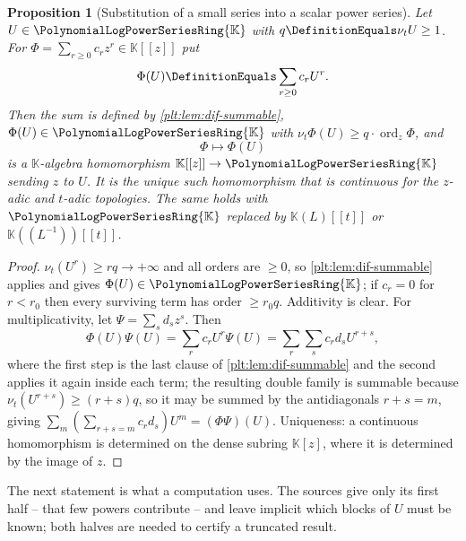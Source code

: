 \documentclass[11pt,oneside]{article}
\theoremstyle{plain}
\newtheorem{proposition}[theorem]{Proposition}
\theoremstyle{definition}
\theoremstyle{remark}
\newcommand{\K}{\mathbb{K}}
\newcommand{\PLpow}{\PolynomialLogPowerSeriesRing{\K}}   %
\newcommand{\ordt}{\nu_{t}}                              %
\begin{document}
\begin{proposition}[Substitution of a small series into a scalar power series]
\label{plt:prop:dif-substitution}
Let \(U\in\PLpow\) with \(q\DefinitionEquals\ordt U\ge1\).  For
\(\Phi=\sum_{r\ge0}c_{r}z^{r}\in\K[[z]]\) put
\begin{equation}\label{plt:eq:dif-substitution}
  \Phi(U)\DefinitionEquals\sum_{r\ge0}c_{r}U^{r}.
\end{equation}
Then the sum is defined by \cref{plt:lem:dif-summable}, \(\Phi(U)\in\PLpow\)
with \(\ordt\Phi(U)\ge q\cdot\operatorname{ord}_{z}\Phi\), and
\[
  \Phi\longmapsto\Phi(U)
\]
is a \(\K\)-algebra homomorphism \(\K[[z]]\to\PLpow\) sending \(z\) to \(U\).
It is the unique such homomorphism that is continuous for the \(z\)-adic and
\(t\)-adic topologies.  The same holds with \(\PLpow\) replaced by
\(\K(L)[[t]]\) or \(\K((L^{-1}))[[t]]\).
\end{proposition}

\begin{proof}
\(\ordt(U^{r})\ge rq\to+\infty\) and all orders are \(\ge0\), so
\cref{plt:lem:dif-summable} applies and gives \(\Phi(U)\in\PLpow\); if
\(c_{r}=0\) for \(r<r_{0}\) then every surviving term has order \(\ge r_{0}q\).
Additivity is clear.  For multiplicativity, let \(\Psi=\sum_{s}d_{s}z^{s}\).
Then
\[
  \Phi(U)\Psi(U)
  =\sum_{r}c_{r}U^{r}\Psi(U)
  =\sum_{r}\sum_{s}c_{r}d_{s}U^{r+s},
\]
where the first step is the last clause of \cref{plt:lem:dif-summable} and the
second applies it again inside each term; the resulting double family is
summable because \(\ordt(U^{r+s})\ge(r+s)q\), so it may be summed by the
antidiagonals \(r+s=m\), giving \(\sum_{m}(\sum_{r+s=m}c_{r}d_{s})U^{m}
=(\Phi\Psi)(U)\).  Uniqueness: a continuous homomorphism is determined on the
dense subring \(\K[z]\), where it is determined by the image of \(z\).
\end{proof}

The next statement is what a computation uses.  The sources give only its
first half -- that few powers contribute -- and leave implicit which blocks of
\(U\) must be known; both halves are needed to certify a truncated result.
\end{document}
